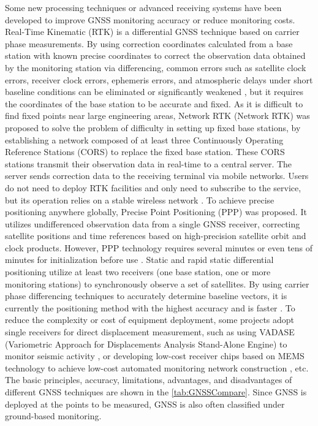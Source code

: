 \documentclass[preprint,11pt,authoryear,3p]{elsarticle}
\begin{document}
Some new processing techniques or advanced receiving systems have been developed to improve GNSS monitoring accuracy or reduce monitoring costs. Real-Time Kinematic (RTK) is a differential GNSS technique based on carrier phase measurements. By using correction coordinates calculated from a base station with known precise coordinates to correct the observation data obtained by the monitoring station via differencing, common errors such as satellite clock errors, receiver clock errors, ephemeris errors, and atmospheric delays under short baseline conditions can be eliminated or significantly weakened \citep{huang2023gnss, shen2019review}, but it requires the coordinates of the base station to be accurate and fixed. As it is difficult to find fixed points near large engineering areas, Network RTK (Network RTK) was proposed to solve the problem of difficulty in setting up fixed base stations, by establishing a network composed of at least three Continuously Operating Reference Stations (CORS) to replace the fixed base station. These CORS stations transmit their observation data in real-time to a central server. The server sends correction data to the receiving terminal via mobile networks. Users do not need to deploy RTK facilities and only need to subscribe to the service, but its operation relies on a stable wireless network \citep{weng2021improving}. To achieve precise positioning anywhere globally, Precise Point Positioning (PPP) was proposed. It utilizes undifferenced observation data from a single GNSS receiver, correcting satellite positions and time references based on high-precision satellite orbit and clock products. However, PPP technology requires several minutes or even tens of minutes for initialization before use \citep{knoop2017lane}. Static and rapid static differential positioning utilize at least two receivers (one base station, one or more monitoring stations) to synchronously observe a set of satellites. By using carrier phase differencing techniques to accurately determine baseline vectors, it is currently the positioning method with the highest accuracy and is faster \citep{CARDELLACH20082927, zangenehnejad2021gnss}. To reduce the complexity or cost of equipment deployment, some projects adopt single receivers for direct displacement measurement, such as using VADASE (Variometric Approach for Displacements Analysis Stand-Alone Engine) to monitor seismic activity \citep{shen2019review}, or developing low-cost receiver chips based on MEMS technology to achieve low-cost automated monitoring network construction \citep{marut2024affordable}, etc. The basic principles, accuracy, limitations, advantages, and disadvantages of different GNSS techniques are shown in the \autoref{tab:GNSSCompare}. Since GNSS is deployed at the points to be measured, GNSS is also often classified under ground-based monitoring.
\end{document}
